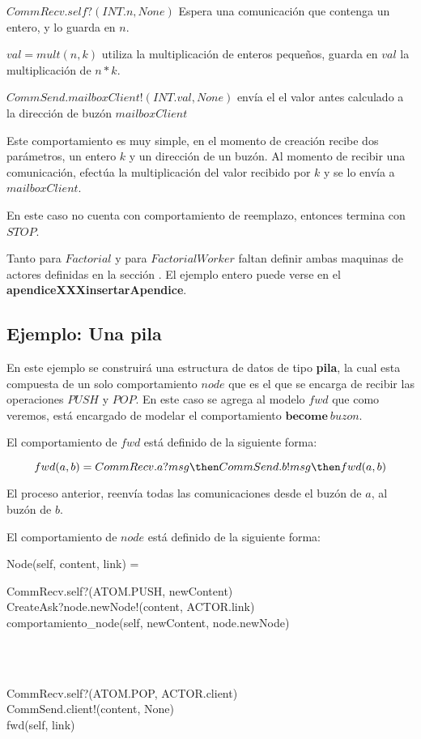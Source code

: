 \begin{description}
 \item $CommRecv.self?(INT.n, None)$ Espera una comunicación que contenga un entero, y lo guarda en $n$.
 \item $val = mult(n, k)$ utiliza la multiplicación de enteros pequeños, guarda en $val$ la multiplicación de $n * k$.
 \item $CommSend.mailboxClient!(INT.val, None)$ envía el el valor antes calculado a la dirección de buzón $mailboxClient$
\end{description}

Este comportamiento es muy simple, en el momento de creación recibe dos parámetros, un entero $k$ y un dirección de un buzón. Al momento de recibir una comunicación, efectúa la multiplicación del valor recibido por $k$ y se lo envía a $mailboxClient$.

En este caso no cuenta con comportamiento de reemplazo, entonces termina con $STOP$.

Tanto para $Factorial$ y para $FactorialWorker$ faltan definir ambas maquinas de actores definidas en la sección  \cite{modelo:crear}. El ejemplo entero puede verse en el \textbf{apendiceXXXinsertarApendice}.


\subsection{Ejemplo: Una pila}

En este ejemplo se construirá una estructura de datos de tipo \textbf{pila}, la cual esta compuesta de un solo comportamiento $node$ que es el que se encarga de recibir las operaciones $PUSH$ y $POP$. En este caso se agrega al modelo $fwd$ que como veremos, está encargado de modelar el comportamiento $\textbf{become}\ buzon$.

El comportamiento de $fwd$ está definido de la siguiente forma:

\[
  fwd(a, b) = CommRecv.a?msg \then CommSend.b!msg \then fwd(a, b)
\]

El proceso anterior, reenvía todas las comunicaciones desde el buzón de $a$, al buzón de $b$.

El comportamiento de $node$ está definido de la siguiente forma:

\begin{process}
Node(self, content, link) = {} \\ \quad
\begin{block}
CommRecv.self?(ATOM.PUSH, newContent) \then \\
CreateAsk?node.newNode!(content, ACTOR.link) \then \\
comportamiento_{node}(self, newContent, node.newNode)
\end{block} \\
\Extchoice \\ \quad
\begin{block}
CommRecv.self?(ATOM.POP, ACTOR.client) \then  \\
CommSend.client!(content, None) \then  \\
fwd(self, link)
\end{block}

\end{process}

